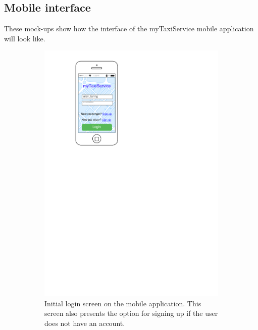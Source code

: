 \FloatBarrier
\subsection{Mobile interface}
These mock-ups show how the interface of the myTaxiService mobile application will look like.

\begin{figure}[h]
    \centering
    \begin{subfigure}{0.45\textwidth}
        \centering
        \includegraphics[width=\textwidth]{mockup/app/MobileLogin}
        \caption{Initial login screen on the mobile application. This screen also presents the option for signing up if the user does not have an account.}
        \label{fig:mockup-login-mobile}
    \end{subfigure}
    \hspace{1cm}
    \begin{subfigure}{0.45\textwidth}

\end{subfigure}
\end{figure}
